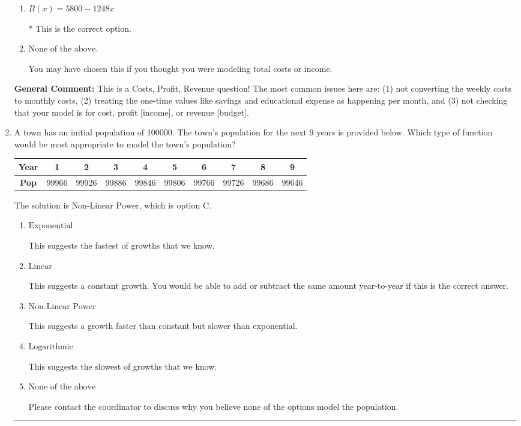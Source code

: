 \documentclass{extbook}[14pt]
\newcommand{\litem}[1]{\item #1

\rule{\textwidth}{0.4pt}}
\begin{document}
\begin{enumerate}
{\begin{enumerate}[label=\Alph*.]
This treats the educational expense and savings as something you get every month rather than a 1-time payment.
\item \( B(x) = 5800 - 1248 x \)

* This is the correct option.
\item \( \text{None of the above.} \)

You may have chosen this if you thought you were modeling total costs or income.
\end{enumerate}

\textbf{General Comment:} This is a Costs, Profit, Revenue question! The most common issues here are: (1) not converting the weekly costs to monthly costs, (2) treating the one-time values like savings and educational expense as happening per month, and (3) not checking that your model is for cost, profit [income], or revenue [budget].
}
\litem{
A town has an initial population of 100000. The town's population for the next 9 years is provided below. Which type of function would be most appropriate to model the town's population?


\begin{tabular}{c|c|c|c|c|c|c|c|c|c}
\textbf{Year} &1 &2 &3 &4 &5 &6 &7 &8 &9\tabularnewline \hline
\textbf{Pop} &99966 &99926 &99886 &99846 &99806 &99766 &99726 &99686 &99646\end{tabular}The solution is \( \text{Non-Linear Power} \), which is option C.\begin{enumerate}[label=\Alph*.]
\item \( \text{Exponential} \)

This suggests the fastest of growths that we know.
\item \( \text{Linear} \)

This suggests a constant growth. You would be able to add or subtract the same amount year-to-year if this is the correct answer.
\item \( \text{Non-Linear Power} \)

This suggests a growth faster than constant but slower than exponential.
\item \( \text{Logarithmic} \)

This suggests the slowest of growths that we know.
\item \( \text{None of the above} \)

Please contact the coordinator to discuss why you believe none of the options model the population.
\end{enumerate}

}
\end{enumerate}
\end{document}
